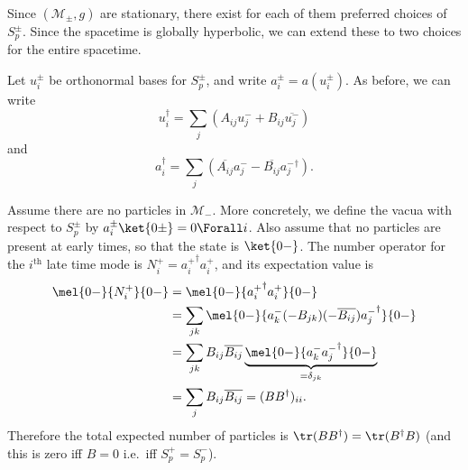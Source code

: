 \documentclass{jknotes}
\begin{document}
\begin{wrapfigure}{l}{0.4\linewidth}
    \centering
\end{wrapfigure}
Since \((\mathcal{M}_\pm,g)\) are stationary, there exist for each of them preferred choices of \(S_p^\pm\). Since the spacetime is globally hyperbolic, we can extend these to two choices for the entire spacetime. 

Let \(u_i^\pm\) be orthonormal bases for \(S_p^\pm\), and write \(a_i^\pm=a(u_i^\pm)\). As before, we can write
\begin{equation}
    u_i^\dagger = \sum_j \left(A_{ij}u_j^- + B_{ij}\overline{u_j^-}\right)
\end{equation}
and 
\begin{equation}
    a_i^\dagger = \sum_j \left(\overline{A_{ij}}a_j^- - \overline{B_{ij}}{a_j^-}^\dagger\right).
\end{equation}

Assume there are no particles in \(\mathcal{M}_-\). More concretely, we define the vacua with respect to \(S_p^\pm\) by \(a_i^\pm\ket{0\pm}=0 \Forall i\). Also assume that no particles are present at early times, so that the state is \(\ket{0-}\). The number operator for the \(i^\text{th}\) late time mode is \(N_i^+ = {a_i^+}^\dagger a_i^+\), and its expectation value is
\begin{align}
    \mel{0-}{N_i^+}{0-} &= \mel{0-}{{a_i^+}^\dagger a_i^+}{0-} \\
                        &= \sum_{jk} \mel{0-}{a_k^-(-B_{jk})(-\overline{B_{ij}}){a_j^-}^\dagger}{0-} \\
                        &= \sum_{jk}B_{ij}\overline{B_{ij}} \underbrace{\mel{0-}{a_k^-{a_j^-}^\dagger}{0-}}_{=\delta_{jk}} \\
                        &= \sum_j B_{ij}\overline{B_{ij}} = (BB^\dagger)_{ii}.
\end{align}
Therefore the total expected number of particles is \(\tr(BB^\dagger) = \tr(B^\dagger B)\) (and this is zero iff \(B=0\) i.e.\ iff \(S^+_p=S^-_p\)).
\end{document}
